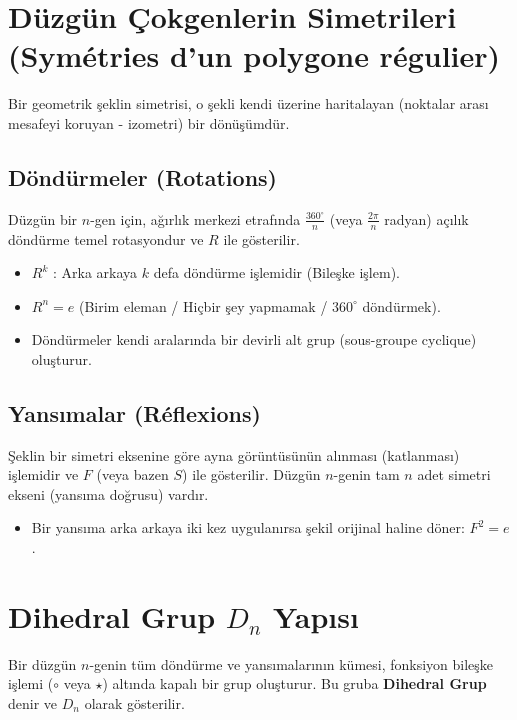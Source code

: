 \documentclass[12pt,a4paper]{report}
\begin{document}
\section{Düzgün Çokgenlerin Simetrileri (Symétries d'un polygone régulier)}
Bir geometrik şeklin simetrisi, o şekli kendi üzerine haritalayan (noktalar arası mesafeyi koruyan - izometri) bir dönüşümdür. 

\subsection*{Döndürmeler (Rotations)}
Düzgün bir $n$-gen için, ağırlık merkezi etrafında $\frac{360^\circ}{n}$ (veya $\frac{2\pi}{n}$ radyan) açılık döndürme temel rotasyondur ve $R$ ile gösterilir.
\begin{itemize}
    \item $R^k$ : Arka arkaya $k$ defa döndürme işlemidir (Bileşke işlem).
    \item $R^n = e$ (Birim eleman / Hiçbir şey yapmamak / $360^\circ$ döndürmek).
    \item Döndürmeler kendi aralarında bir devirli alt grup (sous-groupe cyclique) oluşturur.
\end{itemize}

\subsection*{Yansımalar (Réflexions)}
Şeklin bir simetri eksenine göre ayna görüntüsünün alınması (katlanması) işlemidir ve $F$ (veya bazen $S$) ile gösterilir. Düzgün $n$-genin tam $n$ adet simetri ekseni (yansıma doğrusu) vardır.
\begin{itemize}
    \item Bir yansıma arka arkaya iki kez uygulanırsa şekil orijinal haline döner: $F^2 = e$.
\end{itemize}

\section{Dihedral Grup $D_n$ Yapısı}
Bir düzgün $n$-genin tüm döndürme ve yansımalarının kümesi, fonksiyon bileşke işlemi ($\circ$ veya $\star$) altında kapalı bir grup oluşturur. Bu gruba \textbf{Dihedral Grup} denir ve $D_n$ olarak gösterilir.
\end{document}
